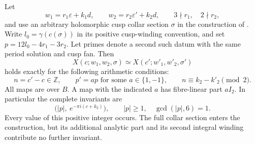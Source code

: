 \begin{proposition}\label{fam:src:B.2.1}\label{fam:st:B.2.1}
Let
\[
 w_1=r_1\varepsilon+k_1d,\qquad w_2=r_2\varepsilon'+k_2d,
 \qquad 3\nmid r_1,\quad 2\nmid r_2,
\]
and use an arbitrary holomorphic cusp collar section $\sigma$ in the construction of \cite[Section 6.4]{AC26}. Write $l_0=\gamma(c(\sigma))$ in its positive cusp-winding convention, and set $p=12l_0-4r_1-3r_2$. Let primes denote a second such datum with the same period solution and cusp fan. Then
\[
 X(c;w_1,w_2,\sigma)\simeq X(c';w'_1,w'_2,\sigma')
\]
holds exactly for the following arithmetic conditions:
\[
 n=c'-c\in\mathbb Z,\qquad
 p'=a p\text{ for some }a\in\{1,-1\},\qquad
 n\equiv k_2-k'_2\pmod2.
\]
All maps are over $B$. A map with the indicated $a$ has fibre-linear part $aI_2$. In particular the complete invariants are
\[
 \bigl(|p|,\ e^{-\pi i(c+k_2)}\bigr),\qquad
 |p|\ge1,\quad\gcd(|p|,6)=1.
\]
Every value of this positive integer occurs. The full collar section enters the construction, but its additional analytic part and its second integral winding contribute no further invariant.
\end{proposition}
